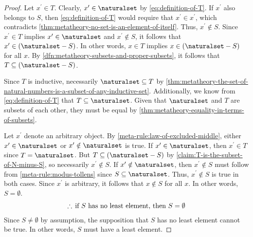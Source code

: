 \begin{proof}
    \noindent
    Let \( x^{\prime} \in T \).
    Clearly, \( x^{\prime} \in \naturalset \) by \eqref{eq:definition-of-T}.
    If \( x^{\prime} \) also belongs to \( S \), then \eqref{eq:definition-of-T} would require that \( x^{\prime} \in x^{\prime} \),
    which contradicts \cref{thm:metatheory-no-set-is-an-element-of-itself}.
    Thus, \( x^{\prime} \notin S \).
    Since \( x^{\prime} \in T \) implies \( x^{\prime} \in \naturalset \) and \( x^{\prime} \notin S \), it follows that
    \( x^{\prime} \in \mleft( \naturalset - S \mright) \). In other words, \( x \in T \) implies \( x \in \mleft( \naturalset - S \mright) \)
    for all \( x \). 
    By \cref{dfn:metatheory-subsets-and-proper-subsets}, it follows that \( T \subseteq \mleft( \naturalset - S \mright) \).

    \vspace{0.3cm}
    \noindent
    Since \( T \) is inductive, necessarily \( \naturalset \subseteq T \) by \cref{thm:metatheory-the-set-of-natural-numbers-is-a-subset-of-any-inductive-set}.
    Additionally, we know from \eqref{eq:definition-of-T} that \( T \subseteq \naturalset \).
    Given that \( \naturalset \) and \( T \) are subsets of each other, they must be equal by \cref{thm:metatheory-equality-in-terms-of-subsets}.
    
    \vspace{0.3cm}
    \noindent
    Let \( x^{\prime} \) denote an arbitrary object.
    By \cref{meta-rule:law-of-excluded-middle}, either \( x^{\prime} \in \naturalset \) or \( x^{\prime} \notin \naturalset \) is true.
    If \( x^{\prime} \in \naturalset \), then \( x^{\prime} \in T \) since \( T = \naturalset \).
    But \( T \subseteq \mleft( \naturalset - S \mright) \) by \cref{claim:T-is-the-subset-of-N-minus-S}, so necessarily \( x^{\prime} \notin S \).
    If \( x^{\prime} \notin \naturalset \), then \( x^{\prime} \notin S \) must follow from \cref{meta-rule:modus-tollens}
    since \( S \subseteq \naturalset \).
    Thus, \( x^{\prime} \notin S \) is true in both cases.
    Since \( x^{\prime} \) is arbitrary, it follows that \( x \notin S \) for all \( x \).
    In other words, \( S = \emptyset \).
    \begin{equation*}
        \therefore \, \text{if \( S \) has no least element, then \( S = \emptyset \)}
    \end{equation*}
    Since \( S \neq \emptyset \) by assumption, the supposition that \( S \) has no least element cannot be true.
    In other words, \( S \) must have a least element.
\end{proof}


